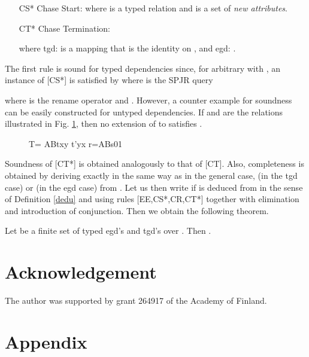 \documentclass[envcountset]{llncs}
\begin{document}
\begin{itemize}
\item[CS*] Chase Start: 
 where  is a typed relation and  is a set of \emph{new attributes}.



\item[CT*] Chase Termination: 


where tgd:  is a mapping   that is the identity on , and egd: .
\end{itemize}

The first rule is sound for typed dependencies since, for arbitrary  with ,  an instance of [CS*] is satisfied by  where  is the SPJR query

where  is the rename operator and . However, a counter example  for soundness can be easily constructed for untyped dependencies. If  and  are the relations illustrated in Fig. \ref{loppu}, then  no extension  of  to   satisfies .
\begin{figure}[h]
\begin{center}
T= ABtxy t'yx r=ABs01 \caption{\label{loppu}}



\end{center}
\end{figure}



 Soundness of [CT*] is obtained analogously to that of [CT]. Also, completeness is obtained by deriving exactly in the same way as in the general case,    (in the tgd case) or   (in the egd case)  from .  Let us then write  if  is deduced from  in the sense of Definition \ref{dedu} and using  rules [EE,CS*,CR,CT*] together with elimination and introduction of conjunction. Then we obtain the following theorem.
\begin{theorem}
Let  be a finite set of typed egd's and tgd's over . Then .
\end{theorem}












\section*{Acknowledgement}
The author was supported by grant 264917 of the Academy of Finland.


\newpage
\section*{Appendix}
\end{document}
